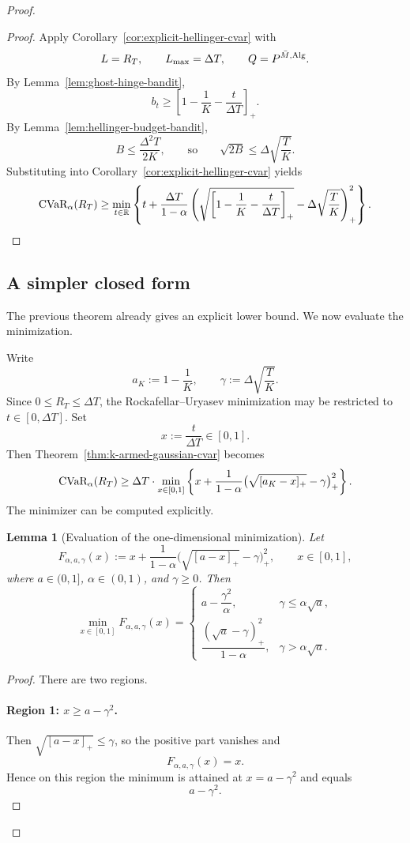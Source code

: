 \documentclass[conference]{IEEEtran}
\newtheorem{lemma}{Lemma}
\begin{document}
\begin{proof}[Proof]
\begin{proof}
Apply Corollary~\ref{cor:explicit-hellinger-cvar} with
\[
L=R_T,
\qquad
L_{\max}=\Delta T,
\qquad
Q=P^{\bar M,\textup{Alg}}.
\]
By Lemma~\ref{lem:ghost-hinge-bandit},
\[
b_t\ge \left[1-\frac1K-\frac{t}{\Delta T}\right]_+.
\]
By Lemma~\ref{lem:hellinger-budget-bandit},
\[
B\le \frac{\Delta^2T}{2K},
\qquad\text{so}\qquad
\sqrt{2B}\le \Delta\sqrt{\frac{T}{K}}.
\]
Substituting into Corollary~\ref{cor:explicit-hellinger-cvar} yields
\[
\textup{CVaR}_\alpha(R_T)
\ge
\min_{t\in\mathbb R}
\left\{
t+\frac{\Delta T}{1-\alpha}
\left(
\sqrt{\left[1-\frac1K-\frac{t}{\Delta T}\right]_+}
-
\Delta\sqrt{\frac{T}{K}}
\right)_+^2
\right\}.
\]
\end{proof}

\subsection{A simpler closed form}

The previous theorem already gives an explicit lower bound.
We now evaluate the minimization.

Write
\[
a_K := 1-\frac1K,
\qquad
\gamma := \Delta\sqrt{\frac{T}{K}}.
\]
Since $0\le R_T\le \Delta T$, the Rockafellar--Uryasev minimization may be restricted to $t\in[0,\Delta T]$.
Set
\[
x:=\frac{t}{\Delta T}\in[0,1].
\]
Then Theorem~\ref{thm:k-armed-gaussian-cvar} becomes
\[
\textup{CVaR}_\alpha(R_T)
\ge
\Delta T \cdot
\min_{x\in[0,1]}
\left\{
x+\frac{1}{1-\alpha}
\bigl(\sqrt{[a_K-x]_+}-\gamma\bigr)_+^2
\right\}.
\]
The minimizer can be computed explicitly.

\begin{lemma}[Evaluation of the one-dimensional minimization]
\label{lem:minimization}
Let
\[
F_{\alpha,a,\gamma}(x)
:=
x+\frac{1}{1-\alpha}\bigl(\sqrt{[a-x]_+}-\gamma\bigr)_+^2,
\qquad x\in[0,1],
\]
where $a\in(0,1]$, $\alpha\in(0,1)$, and $\gamma\ge 0$.
Then
\[
\min_{x\in[0,1]}F_{\alpha,a,\gamma}(x)
=
\begin{cases}
a-\dfrac{\gamma^2}{\alpha}, & \gamma\le \alpha\sqrt a,\\[1.5ex]
\dfrac{(\sqrt a-\gamma)_+^2}{1-\alpha}, & \gamma> \alpha\sqrt a.
\end{cases}
\]
\end{lemma}

\begin{proof}
There are two regions.

\paragraph{Region 1: $x\ge a-\gamma^2$.}
Then $\sqrt{[a-x]_+}\le \gamma$, so the positive part vanishes and
\[
F_{\alpha,a,\gamma}(x)=x.
\]
Hence on this region the minimum is attained at $x=a-\gamma^2$ and equals
\[
a-\gamma^2.
\]


\end{proof}
\end{proof}
\end{document}
